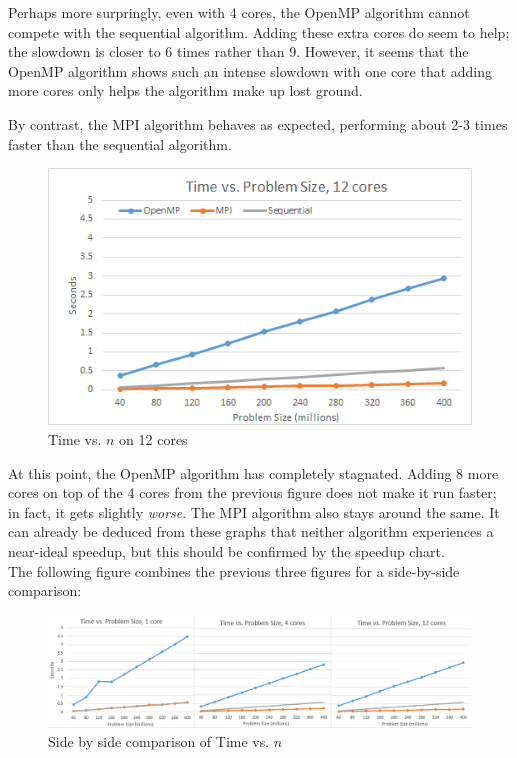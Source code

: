 \documentclass{article}
\begin{document}
Perhaps more surpringly, even with 4 cores, the OpenMP algorithm cannot compete with the sequential algorithm.  Adding these extra cores do seem to help; the slowdown is closer to 6 times rather than 9.  However, it seems that the OpenMP algorithm shows such an intense slowdown with one core that adding more cores only helps the algorithm make up lost ground.

By contrast, the MPI algorithm behaves as expected, performing about 2-3 times faster than the sequential algorithm.

\begin{figure}[H]
	\centering

	\includegraphics[width=1.0\textwidth]{figures/tvn_12.png}

	\caption{Time vs. $n$ on 12 cores}
\end{figure}

At this point, the OpenMP algorithm has completely stagnated.  Adding 8 more cores on top of the 4 cores from the previous figure does not make it run faster; in fact, it gets slightly \textit{worse}.  The MPI algorithm also stays around the same.  It can already be deduced from these graphs that neither algorithm experiences a near-ideal speedup, but this should be confirmed by the speedup chart. \\

The following figure combines the previous three figures for a side-by-side comparison:

\begin{figure}[H]
	\centering

	\includegraphics[width=1.0\textwidth]{figures/tvn_sidebyside.png}

	\caption{Side by side comparison of Time vs. $n$}
\end{figure}
\end{document}
